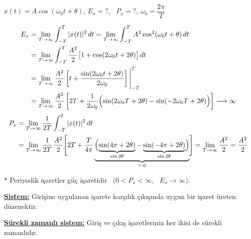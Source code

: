 \documentclass[11pt,a4paper]{article}
\begin{document}
\begin{ornek}
$x(t) = A\cos(\omega_0 t + \theta)$, \quad $E_x = ?$, \ $P_x = ?$, \quad $\omega_0 = \dfrac{2\pi}{T}$
\end{ornek}
\begin{cozum}
\begin{align*}
  E_x &= \lim_{T\to\infty} \int_{-T}^{T} |x(t)|^2\,dt = \lim_{T\to\infty} \int_{-T}^{T} A^2\cos^2(\omega_0 t + \theta)\,dt \\
  &= \lim_{T\to\infty} \int_{-T}^{T} \frac{A^2}{2}\bigl[1 + \cos(2\omega_0 t + 2\theta)\bigr]\,dt \\
  &= \lim_{T\to\infty} \frac{A^2}{2}\left[t + \frac{\sin(2\omega_0 t + 2\theta)}{2\omega_0}\right]\Bigg|_{-T}^{T} \\
  &= \lim_{T\to\infty} \frac{A^2}{2}\left[2T + \frac{1}{2\omega_0}\Bigl(\sin(2\omega_0 T + 2\theta) - \sin(-2\omega_0 T + 2\theta)\Bigr)\right] \longrightarrow \infty
\end{align*}
\begin{align*}
  P_x &= \lim_{T\to\infty} \frac{1}{2T} \int_{-T}^{T} |x(t)|^2\,dt \\
  &= \lim_{T\to\infty} \frac{1}{2T}\,\frac{A^2}{2}\Biggl[2T + \frac{T}{4\pi}\underbrace{\Bigl(\underbrace{\sin(4\pi + 2\theta)}_{\sin 2\theta} - \underbrace{\sin(-4\pi + 2\theta)}_{\sin 2\theta}\Bigr)}_{=\,0}\Biggr] = \lim_{T\to\infty} \frac{A^2}{2} = \frac{A^2}{2}
\end{align*}
\end{cozum}

$\ast$ Periyodik işaretler güç işaretidir \ ($0 < P_x < \infty$, \ $E_x \to \infty$).

\textbf{\underline{Sistem:}} Girişine uygulanan işarete karşılık çıkışında uygun bir işaret üreten düzenektir.

\begin{center}
\end{center}

\textbf{\underline{Sürekli zamanlı sistem:}} Giriş ve çıkış işaretlerinin her ikisi de sürekli zamanlıdır.

\begin{center}
\end{center}
\end{document}
